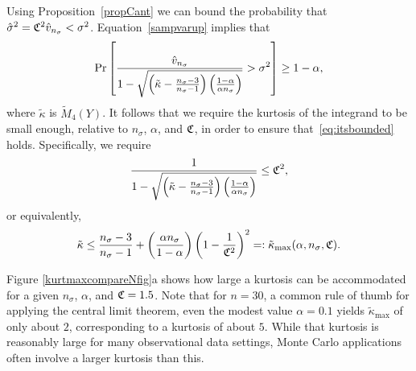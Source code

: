 \documentclass{article}
\begin{document}
Using Proposition~\ref{propCant} we can bound the probability
that $\hat\sigma^2 = \mathfrak{C}^2\hat v_{n_\sigma}<\sigma^2$.
Equation~\eqref{sampvarup} implies that
\begin{equation}\label{eq:itsbounded}
\Pr \left[\frac{\hat{v}_{n_{\sigma}}}{1 - \sqrt{\left ( \tilde\kappa  - \frac{n_{\sigma}-3}{n_{\sigma}-1}\right)\left(\frac{1-\alpha}{\alpha n_{\sigma}}\right)}} > \sigma^2 \right] \ge 1 - \alpha,
\end{equation}
where $\tilde\kappa$ is $\widetilde M_4(Y)$.
It follows that we require the kurtosis of the integrand to be small enough, relative to $n_{\sigma}$, $\alpha$, and $\mathfrak{C}$, in order to ensure 
that~\eqref{eq:itsbounded} holds. Specifically, we require
$$
\frac{1}{1 - \sqrt{\left ( \tilde\kappa  - \frac{n_{\sigma}-3}{n_{\sigma}-1}\right)\left(\frac{1-\alpha}{\alpha n_{\sigma}}\right)}} \le \mathfrak{C}^2,
$$
or equivalently,
\begin{equation}
\label{kappamaxdef}
\tilde\kappa \le \frac{n_{\sigma}-3}{n_{\sigma}-1} + \left(\frac{ \alpha n_{\sigma}}{1-\alpha}\right) \left(1 - \frac{1}{\mathfrak{C}^2}\right)^2 =: \tilde\kappa_{\max} (\alpha,n_{\sigma},\mathfrak{C}). 
\end{equation}

Figure \ref{kurtmaxcompareNfig}a shows how large a kurtosis can be accommodated for a given $n_{\sigma}$, $\alpha$, and $\mathfrak{C}=1.5$.  Note that for $n=30$, a common rule of thumb for applying the central limit theorem, even the modest value $\alpha=0.1$ yields
$\tilde\kappa_{\max}$ of only about $2$,
corresponding to a kurtosis of about $5$. 
While that kurtosis is reasonably large for many
observational data settings,
Monte Carlo applications
often involve a larger kurtosis than this.
\end{document}
